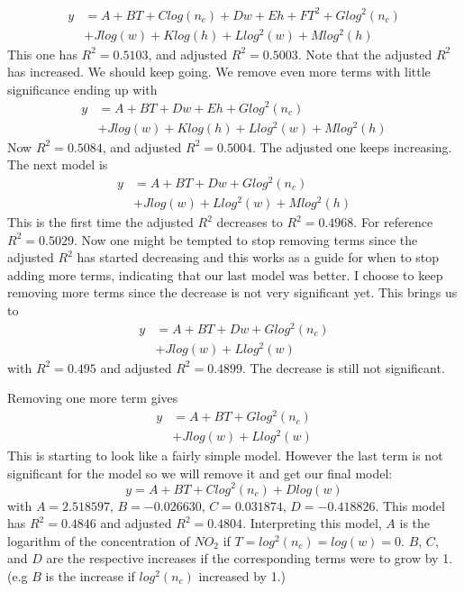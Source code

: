 \documentclass[a4paper]{article}
\begin{document}
\begin{equation}
\begin{aligned}
y  &= A + BT + Clog(n_c)+ Dw + Eh + FT^2 + Glog^2(n_c) \\
   &+ Jlog(w)+Klog(h)+Llog^2(w)+Mlog^2(h)
\end{aligned}
\end{equation}
This one has $R^2 = 0.5103$, and adjusted $R^2=0.5003$. Note that the adjusted $R^2$ has increased. We should keep going.
We remove even more terms with little significance ending up with 
\begin{equation}
\begin{aligned}
y  &= A + BT + Dw + Eh + Glog^2(n_c) \\
   &+Jlog(w)+Klog(h)+Llog^2(w)+Mlog^2(h)
\end{aligned}
\end{equation}
Now $R^2=0.5084$, and adjusted $R^2=0.5004$. The adjusted one keeps increasing.	
The next model is 
\begin{equation}
\begin{aligned}
y  &= A + BT + Dw + Glog^2(n_c) \\
   &+Jlog(w)+Llog^2(w)+Mlog^2(h)
\end{aligned}
\end{equation}
This is the first time the adjusted $R^2$ decreases to $R^2= 0.4968$. For reference $R^2 = 0.5029$. Now one might be tempted to stop removing terms since the adjusted $R^2$ has started decreasing and this works as a guide for when to stop adding more terms, indicating that our last model was better. I choose to keep removing more terms since the decrease is not very significant yet.
This brings us to
\begin{equation}
\begin{aligned}
y  &= A + BT + Dw + Glog^2(n_c) \\
   &+Jlog(w)+Llog^2(w)
\end{aligned}
\end{equation}
with $R^2 = 0.495$ and adjusted $R^2 = 0.4899$. The decrease is still not significant.

Removing one more term gives
\begin{equation}
\begin{aligned}
y  &= A + BT + Glog^2(n_c) \\
   &+Jlog(w)+Llog^2(w)
\end{aligned}
\end{equation}
This is starting to look like a fairly simple model. However the last term is not significant for the model so we will remove it and get our final model:
\begin{equation}
y = A + BT + Clog^2(n_c) + Dlog(w)
\end{equation}
with $A=2.518597$, $B=-0.026630$, $C=0.031874$, $D=-0.418826$.
This model has $R^2=0.4846$ and adjusted $R^2=0.4804$.
Interpreting this model, $A$ is the logarithm of the concentration of $NO_2$ if $T=log^2(n_c)=log(w)=0$. $B$, $C$, and $D$ are the respective increases if the corresponding terms were to grow by 1. (e.g $B$ is the increase if $log^2(n_c)$ increased by 1.)
\end{document}
